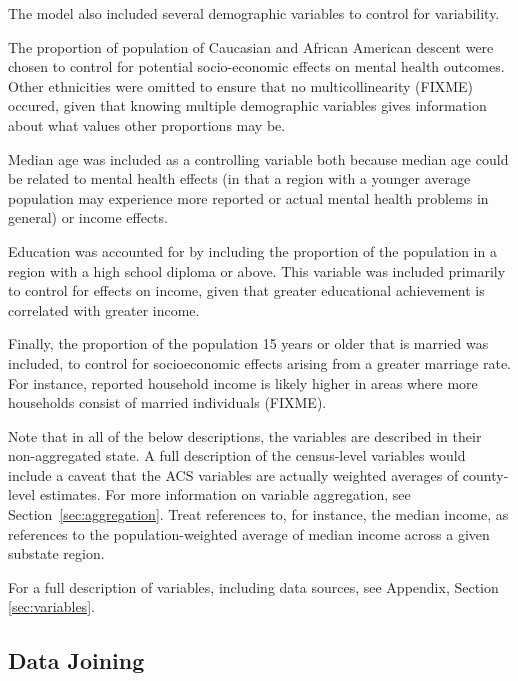 \documentclass{article}
\begin{document}
The model also included several demographic variables to control for
variability.

The proportion of population of Caucasian and African
American descent were chosen to control for potential socio-economic
effects on mental health outcomes. Other ethnicities were omitted to
ensure that no multicollinearity (FIXME) occured, given that knowing
multiple demographic variables gives information about what values other
proportions may be.

Median age was included as a controlling variable
both because median age could be related to mental health effects (in
that a region with a younger average population may experience more
reported or actual mental health problems in general) or income effects.

Education was accounted for by including the proportion of the
population in a region with a high school diploma or above. This
variable was included primarily to control for effects on income, given
that greater educational achievement is correlated with greater income.

Finally, the proportion of the population 15 years or older that is
married was included, to control for socioeconomic effects arising from
a greater marriage rate. For instance, reported household income is
likely higher in areas where more households consist of married
individuals (FIXME).

%
%

Note that in all of the below descriptions, the variables are described in their
non-aggregated state. A full description of the census-level variables would
include a caveat that the ACS variables are actually weighted averages of
county-level estimates. For more information on variable aggregation, see
Section~\ref{sec:aggregation}. Treat references to, for instance, the
median income, as references to the population-weighted average of
median income across a given substate region.


For a full description of variables, including data sources, see
Appendix, Section \ref{sec:variables}.

\subsection{Data Joining}\label{sec:joining}
\end{document}
